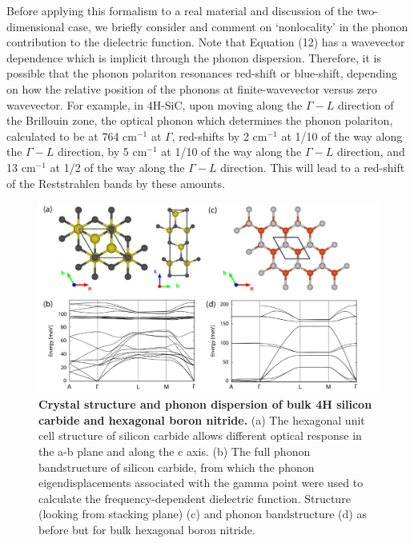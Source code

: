 \documentclass[aps,prb,twocolumn,
	groupedaddress,superscriptaddress,
	amsfonts,amssymb,amsmath,floatfix,
	citeautoscript]{revtex4-1}
\begin{document}
Before applying this formalism to a real material and discussion of the two-dimensional case, we briefly consider and comment on `nonlocality' in the phonon contribution to the dielectric function. Note that Equation (12) has a wavevector dependence which is implicit through the phonon dispersion.  Therefore, it is possible that the phonon polariton resonances red-shift or blue-shift, depending on how the relative position of the phonons at finite-wavevector versus zero wavevector. For example, in 4H-SiC, upon moving along the $\Gamma-L$ direction of the Brillouin zone, the optical phonon which determines the phonon polariton, calculated to be at 764 cm$^{-1}$ at $\Gamma$, red-shifts by 2  cm$^{-1}$ at 1/10 of the way along the $\Gamma-L$ direction, by 5 cm$^{-1}$ at 1/10 of the way along the $\Gamma-L$ direction, and 13 cm$^{-1}$ at 1/2 of the way along the $\Gamma-L$ direction. This will lead to a red-shift of the Reststrahlen bands by these amounts.
\begin{figure}[t]
\includegraphics[width=16cm]{combined_structure.pdf}
\caption{\textbf{Crystal structure and phonon dispersion of bulk 4H silicon carbide and hexagonal boron nitride.} (a) The hexagonal unit cell structure of silicon carbide allows different optical response in the a-b plane and along the c axis. (b) The full phonon bandstructure of silicon carbide, from which the phonon eigendisplacements associated with the gamma point were used to calculate the frequency-dependent dielectric function. Structure (looking from stacking plane) (c) and phonon bandstructure (d) as before but for bulk hexagonal boron nitride.}
\label{fig:phonons}
\end{figure}
\end{document}
